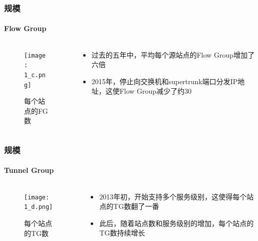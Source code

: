 \begin{frame}
    \frametitle{规模}
    \framesubtitle{Flow Group}
    \begin{columns}
        \begin{column}{0.4\textwidth}
        \begin{figure}
            \centering
            \texttt{[image: 1\_c.png]}
            \caption{每个站点的FG数}
        \end{figure}
        \end{column}
        
        \begin{column}{0.6\textwidth}
            \begin{itemize}
                \item 过去的五年中，平均每个源站点的Flow Group增加了六倍
                \item 2015年，停止向交换机和supertrunk端口分发IP地址，这使Flow Group减少了约30%
            \end{itemize}
        \end{column}
    \end{columns}
\end{frame}

\begin{frame}
    \frametitle{规模}
    \framesubtitle{Tunnel Group}
    \begin{columns}
        \begin{column}{0.4\textwidth}
        \begin{figure}
            \centering
            \texttt{[image: 1\_d.png]}
            \caption{每个站点的TG数}
        \end{figure}
        \end{column}
        
        \begin{column}{0.6\textwidth}
            \begin{itemize}
                \item 2013年初，开始支持多个服务级别，这使得每个站点的TG数翻了一番
                \item 此后，随着站点数和服务级别的增加，每个站点的TG数持续增长
            \end{itemize}
        \end{column}
    \end{columns}
\end{frame}

